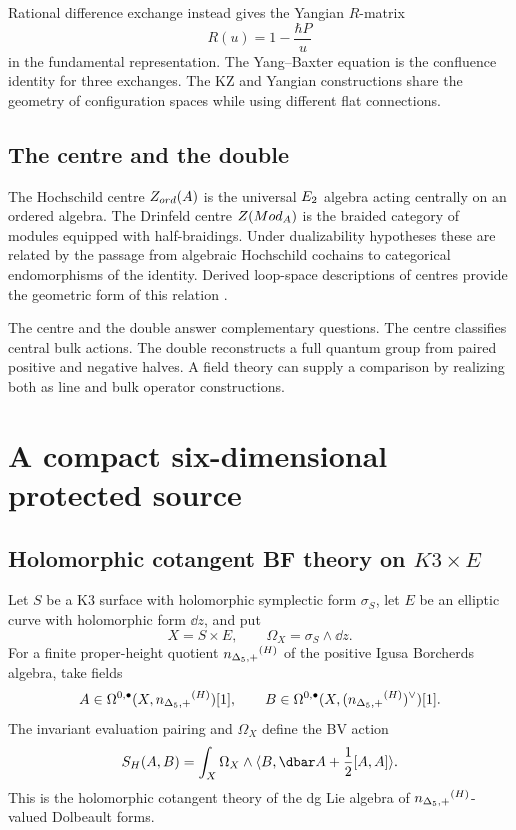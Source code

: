 Rational difference exchange instead gives the Yangian $R$-matrix
\[
 R(u)=1-\frac{\hbar P}{u}
\]
in the fundamental representation. The Yang--Baxter equation is the confluence identity for three exchanges. The KZ and Yangian constructions share the geometry of configuration spaces while using different flat connections.

\chapter{The centre and the double}
The Hochschild centre $Z_{ord}(A)$ is the universal $E_2$ algebra acting centrally on an ordered algebra. The Drinfeld centre $Z(Mod_A)$ is the braided category of modules equipped with half-braidings. Under dualizability hypotheses these are related by the passage from algebraic Hochschild cochains to categorical endomorphisms of the identity. Derived loop-space descriptions of centres provide the geometric form of this relation \cite{BenZviFrancisNadler}.

The centre and the double answer complementary questions. The centre classifies central bulk actions. The double reconstructs a full quantum group from paired positive and negative halves. A field theory can supply a comparison by realizing both as line and bulk operator constructions.


\part{A compact six-dimensional protected source}

\chapter{Holomorphic cotangent BF theory on \texorpdfstring{$K3\times E$}{K3 x E}}
Let $S$ be a K3 surface with holomorphic symplectic form $\sigma_S$, let $E$ be an elliptic curve with holomorphic form $\dd z$, and put
\[
 X=S\times E,
 \qquad
 \Omega_X=\sigma_S\wedge\dd z.
\]
For a finite proper-height quotient ${n_{\Delta_5,+}}^{(H)}$ of the positive Igusa Borcherds algebra, take fields
\[
 A\in\Omega^{0,\bullet}(X,{n_{\Delta_5,+}}^{(H)})[1],
 \qquad
 B\in\Omega^{0,\bullet}(X,({n_{\Delta_5,+}}^{(H)})^\vee)[1].
\]
The invariant evaluation pairing and $\Omega_X$ define the BV action
\begin{equation}\label{eq:vol4-compact-hbf}
 S_H(A,B)=
 \int_X\Omega_X\wedge
 \angles{B,\dbar A+\frac12[A,A]}.
\end{equation}
This is the holomorphic cotangent theory of the dg Lie algebra of ${n_{\Delta_5,+}}^{(H)}$-valued Dolbeault forms.

